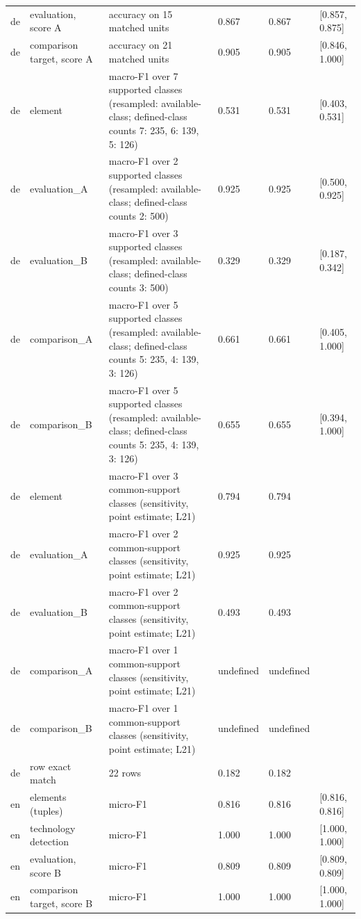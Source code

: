 \begin{table}[htbp]
\begin{tabular}{llllll}
de & evaluation, score A & accuracy on 15 matched units & 0.867 & 0.867 & [0.857, 0.875] \\
de & comparison target, score A & accuracy on 21 matched units & 0.905 & 0.905 & [0.846, 1.000] \\
de & element & macro-F1 over 7 supported classes (resampled: available-class; defined-class counts {7: 235, 6: 139, 5: 126}) & 0.531 & 0.531 & [0.403, 0.531] \\
de & evaluation\_A & macro-F1 over 2 supported classes (resampled: available-class; defined-class counts {2: 500}) & 0.925 & 0.925 & [0.500, 0.925] \\
de & evaluation\_B & macro-F1 over 3 supported classes (resampled: available-class; defined-class counts {3: 500}) & 0.329 & 0.329 & [0.187, 0.342] \\
de & comparison\_A & macro-F1 over 5 supported classes (resampled: available-class; defined-class counts {5: 235, 4: 139, 3: 126}) & 0.661 & 0.661 & [0.405, 1.000] \\
de & comparison\_B & macro-F1 over 5 supported classes (resampled: available-class; defined-class counts {5: 235, 4: 139, 3: 126}) & 0.655 & 0.655 & [0.394, 1.000] \\
de & element & macro-F1 over 3 common-support classes (sensitivity, point estimate; L21) & 0.794 & 0.794 &  \\
de & evaluation\_A & macro-F1 over 2 common-support classes (sensitivity, point estimate; L21) & 0.925 & 0.925 &  \\
de & evaluation\_B & macro-F1 over 2 common-support classes (sensitivity, point estimate; L21) & 0.493 & 0.493 &  \\
de & comparison\_A & macro-F1 over 1 common-support classes (sensitivity, point estimate; L21) & undefined & undefined &  \\
de & comparison\_B & macro-F1 over 1 common-support classes (sensitivity, point estimate; L21) & undefined & undefined &  \\
de & row exact match & 22 rows & 0.182 & 0.182 &  \\
en & elements (tuples) & micro-F1 & 0.816 & 0.816 & [0.816, 0.816] \\
en & technology detection & micro-F1 & 1.000 & 1.000 & [1.000, 1.000] \\
en & evaluation, score B & micro-F1 & 0.809 & 0.809 & [0.809, 0.809] \\
en & comparison target, score B & micro-F1 & 1.000 & 1.000 & [1.000, 1.000] \\

\end{tabular}
\end{table}
